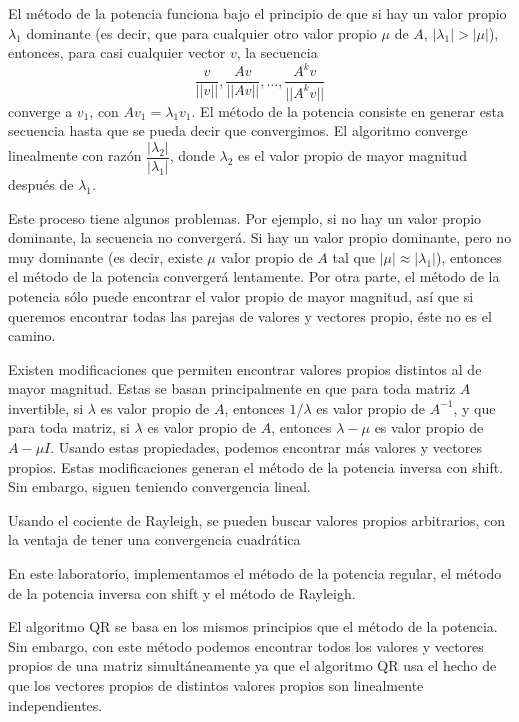 \documentclass[11pt]{article}
\begin{document}
El método de la potencia funciona bajo el principio de que si hay un valor propio $\lambda_1$ dominante (es decir, que para cualquier otro valor propio $\mu$ de $A$, $|\lambda_1|>|\mu|$), entonces, para casi cualquier vector $v$, la secuencia $$\dfrac{v}{||v||},\dfrac{Av}{||Av||},\dots,\dfrac{A^kv}{||A^kv||}$$ converge a $v_1$, con $Av_1=\lambda_1v_1$. El método de la potencia consiste en generar esta secuencia hasta que se pueda decir que convergimos. El algoritmo converge linealmente con razón $\dfrac{|\lambda_2|}{|\lambda_1|}$, donde $\lambda_2$ es el valor propio de mayor magnitud después de $\lambda_1$.



Este proceso tiene algunos problemas. Por ejemplo, si no hay un valor propio dominante, la secuencia no convergerá. Si hay un valor propio dominante, pero no muy dominante (es decir, existe $\mu$ valor propio de $A$ tal que $|\mu|\approx |\lambda_1|$), entonces el método de la potencia convergerá lentamente. Por otra parte, el método de la potencia sólo puede encontrar el valor propio de mayor magnitud, así que si queremos encontrar todas las parejas de valores y vectores propio, éste no es el camino.



Existen modificaciones que permiten encontrar valores propios distintos al de mayor magnitud. Estas se basan principalmente en que para toda matriz $A$ invertible, si $\lambda$ es valor propio de $A$, entonces $1/\lambda$ es valor propio de $A^{-1}$, y que para toda matriz, si $\lambda$ es valor propio de $A$, entonces $\lambda-\mu$ es valor propio de $A-\mu I$. Usando estas propiedades, podemos encontrar más valores y vectores propios. Estas modificaciones generan el método de la potencia inversa con shift. Sin embargo, siguen teniendo convergencia lineal.



Usando el cociente de Rayleigh, se pueden buscar valores propios arbitrarios, con la ventaja de tener una convergencia cuadrática



En este laboratorio, implementamos el método de la potencia regular, el método de la potencia inversa con shift y el método de Rayleigh.



El algoritmo QR se basa en los mismos principios que el método de la potencia. Sin embargo, con este método podemos encontrar todos los valores y vectores propios de una matriz simultáneamente ya que el algoritmo QR usa el hecho de que los vectores propios de distintos valores propios son linealmente independientes.
\end{document}
